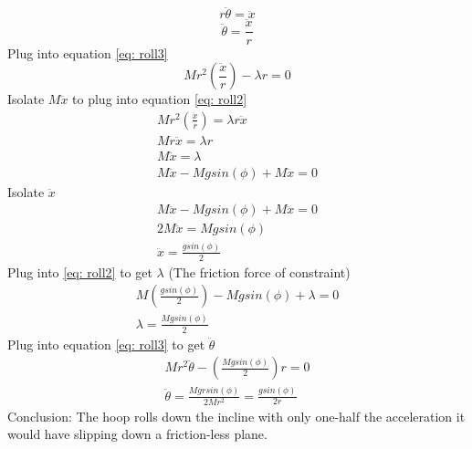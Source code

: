 \documentclass[12pt]{article}
\begin{document}
    \begin{equation}
        r \ddot{\theta} = \ddot{x}
    \end{equation}
    \begin{equation}
        \ddot{\theta} = \frac{\ddot{x}}{r}
    \end{equation}
    Plug into equation \ref{eq: roll3}
    \begin{equation}
        M r^2 \left(\frac{\ddot{x}}{r} \right) - \lambda r = 0
    \end{equation}
    Isolate $M \ddot{x}$ to plug into equation \ref{eq: roll2}
    \begin{gather*}
        M r^2 \left(\frac{\ddot{x}}{r} \right) = \lambda r\ddot{x}
        \\ M r \ddot{x} = \lambda r
        \\ M \ddot{x} = \lambda
        \\ M \ddot{x} - M g sin(\phi) + M \ddot{x} = 0
    \end{gather*}
    Isolate $\ddot{x}$
    \begin{gather*}
        M \ddot{x} - M g sin(\phi) + M \ddot{x} = 0
        \\ 2 M \ddot{x} = M g sin(\phi)
        \\ \ddot{x} = \frac{g sin(\phi)}{2}
    \end{gather*}
    Plug into \ref{eq: roll2} to get $\lambda$ (The friction force of constraint)
    \begin{gather*}
        M \left(\frac{g sin(\phi)}{2} \right) - M g sin(\phi) + \lambda = 0
        \\ \lambda = \frac{M g sin(\phi)}{2}
    \end{gather*}
    Plug into equation \ref{eq: roll3} to get $\ddot{\theta}$ 
    \begin{gather*}
        M r^2 \ddot{\theta} - \left(\frac{M g sin(\phi)}{2} \right) r = 0
        \\ \ddot{\theta} = \frac{M g r sin(\phi)}{2 M r^2} =  \frac{g sin(\phi)}{2 r}
    \end{gather*}
    Conclusion: The hoop rolls down the incline with only one-half the acceleration it would have slipping down a friction-less plane.
\end{document}
